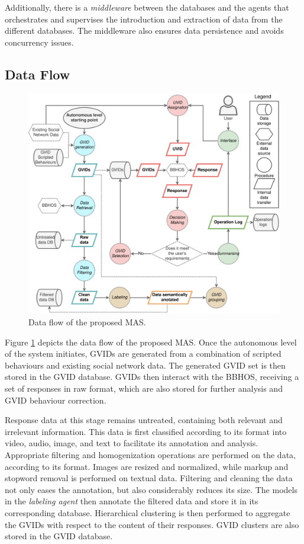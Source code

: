 Additionally, there is a \textit{middleware} between the databases and the agents that orchestrates and supervises the introduction and extraction of data from the different databases. The middleware also ensures data persistence and avoids concurrency issues.

\subsection{Data Flow}\label{6_sec:subsec:data_flow}

\begin{figure}[t]
    \centering
    \includegraphics[width=\linewidth]{6_kbsextractiondl/figures/Data_flow.eps}
    \caption{Data flow of the proposed MAS. }
    \label{fig:data_flow_mas}
\end{figure}

Figure \ref{fig:data_flow_mas} depicts the data flow of the proposed MAS. Once the autonomous level of the system initiates, GVIDs are generated from a combination of scripted behaviours and existing social network data. The generated GVID set is then stored in the GVID database. GVIDs then interact with the BBHOS, receiving a set of responses in raw format, which are also stored for further analysis and GVID behaviour correction. 

Response data at this stage remains untreated, containing both relevant and irrelevant information. This data is first classified according to its format into video, audio, image, and text to facilitate its annotation and analysis. Appropriate filtering and homogenization operations are performed on the data, according to its format. Images are resized and normalized, while markup and stopword removal is performed on textual data. Filtering and cleaning the data not only eases the annotation, but also considerably reduces its size. The models in the \textit{labeling agent} then annotate the filtered data and store it in its corresponding database. Hierarchical clustering is then performed to aggregate the GVIDs with respect to the content of their responses. GVID clusters are also stored in the GVID database.

